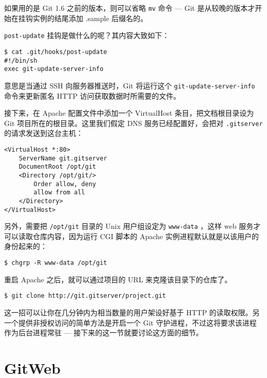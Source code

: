 \documentclass[a4paper]{book}
\begin{document}
如果用的是 Git 1.6 之前的版本，则可以省略 \texttt{mv} 命令 --- Git 是从较晚的版本才开始在挂钩实例的结尾添加 .sample 后缀名的。

\texttt{post-update} 挂钩是做什么的呢？其内容大致如下：

\begin{shaded}\begin{verbatim}
$ cat .git/hooks/post-update 
#!/bin/sh
exec git-update-server-info
\end{verbatim}\end{shaded}

意思是当通过 SSH 向服务器推送时，Git 将运行这个 \texttt{git-update-server-info} 命令来更新匿名 HTTP 访问获取数据时所需要的文件。

接下来，在 Apache 配置文件中添加一个 VirtualHost 条目，把文档根目录设为 Git 项目所在的根目录。这里我们假定 DNS 服务已经配置好，会把对 \texttt{.gitserver} 的请求发送到这台主机：

\begin{shaded}\begin{verbatim}
<VirtualHost *:80>
    ServerName git.gitserver
    DocumentRoot /opt/git
    <Directory /opt/git/>
        Order allow, deny
        allow from all
    </Directory>
</VirtualHost>
\end{verbatim}\end{shaded}

另外，需要把 \texttt{/opt/git} 目录的 Unix 用户组设定为 \texttt{www-data} ，这样 web 服务才可以读取仓库内容，因为运行 CGI 脚本的 Apache 实例进程默认就是以该用户的身份起来的：

\begin{shaded}\begin{verbatim}
$ chgrp -R www-data /opt/git
\end{verbatim}\end{shaded}

重启 Apache 之后，就可以通过项目的 URL 来克隆该目录下的仓库了。

\begin{shaded}\begin{verbatim}
$ git clone http://git.gitserver/project.git
\end{verbatim}\end{shaded}

这一招可以让你在几分钟内为相当数量的用户架设好基于 HTTP 的读取权限。另一个提供非授权访问的简单方法是开启一个 Git 守护进程，不过这将要求该进程作为后台进程常驻 --- 接下来的这一节就要讨论这方面的细节。

\section{GitWeb}
\end{document}
